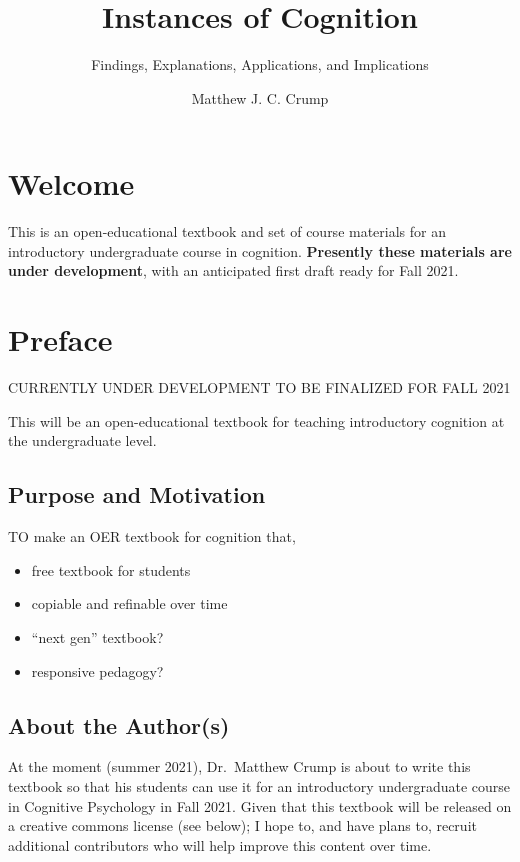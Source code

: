 \documentclass[
  oneside,
  12pt]{crumpbook}
\title{Instances of Cognition}
\subtitle{Findings, Explanations, Applications, and Implications}
\author{Matthew J. C. Crump}
\date{}
\providecommand{\tightlist}{%
  \setlength{\itemsep}{0pt}\setlength{\parskip}{0pt}}
\begin{document}
\maketitle

{
\setcounter{tocdepth}{1}
\tableofcontents
}
\hypertarget{welcome}{%
\chapter*{Welcome}\label{welcome}}

This is an open-educational textbook and set of course materials for an introductory undergraduate course in cognition. \textbf{Presently these materials are under development}, with an anticipated first draft ready for Fall 2021.

\hypertarget{preface}{%
\chapter*{Preface}\label{preface}}

CURRENTLY UNDER DEVELOPMENT TO BE FINALIZED FOR FALL 2021

This will be an open-educational textbook for teaching introductory cognition at the undergraduate level.

\hypertarget{purpose-and-motivation}{%
\section{Purpose and Motivation}\label{purpose-and-motivation}}

TO make an OER textbook for cognition that,

\begin{itemize}
\tightlist
\item
  free textbook for students
\item
  copiable and refinable over time
\item
  ``next gen'' textbook?
\item
  responsive pedagogy?
\end{itemize}

\hypertarget{about-the-authors}{%
\section{About the Author(s)}\label{about-the-authors}}

At the moment (summer 2021), Dr.~Matthew Crump is about to write this textbook so that his students can use it for an introductory undergraduate course in Cognitive Psychology in Fall 2021. Given that this textbook will be released on a creative commons license (see below); I hope to, and have plans to, recruit additional contributors who will help improve this content over time.
\end{document}
